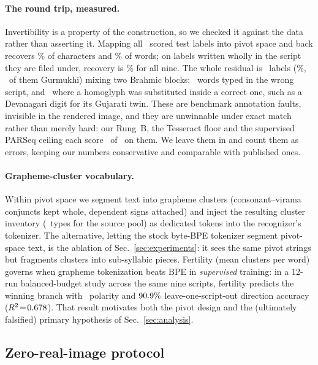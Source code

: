 \paragraph{The round trip, measured.} Invertibility is a property of the construction, so we
checked it against the data rather than asserting it. Mapping all \rtTestN\ scored test labels into
pivot space and back recovers \rtCharPooled\% of characters and \rtWordPooled\% of words; on labels
written wholly in the script they are filed under, recovery is \rtWordPure\% for all nine. The
whole residual is \rtCrossN\ labels (\rtCrossPct\%, \rtCrossGurmukhi\ of them Gurmukhi) mixing two
Brahmic blocks: \rtCrossWhole\ words typed in the wrong script, and \rtCrossMixed\ where a homoglyph
was substituted inside a correct one, such as a Devanagari digit for its Gujarati twin. These are
benchmark annotation faults, invisible in the rendered image, and they are unwinnable under exact
match rather than merely hard: our Rung~B, the Tesseract floor and the supervised PARSeq ceiling
each score \rtCrossSolved\ of \rtCrossN\ on them. We leave them in and count them as errors, keeping
our numbers conservative and comparable with published ones.

\paragraph{Grapheme-cluster vocabulary.} Within pivot space we segment text into grapheme
clusters (consonant--virama conjuncts kept whole, dependent signs attached) and inject the
resulting cluster inventory (\pivotTypes\ types for the source pool) as dedicated tokens into the
recognizer's tokenizer. The alternative, letting the stock byte-BPE tokenizer segment
pivot-space text, is the ablation of Sec.~\ref{sec:experiments}: it sees the same pivot
strings but fragments clusters into sub-syllabic pieces. Fertility (mean clusters per word)
governs when grapheme tokenization beats BPE in \emph{supervised} training: in a 12-run
balanced-budget study across the same nine scripts, fertility predicts the winning branch with
\lawPolarity\ polarity and $90.9\%$ leave-one-script-out direction accuracy
($R^2\!=\!0.678$). %
That result motivates both the pivot design and the (ultimately falsified) primary hypothesis of
Sec.~\ref{sec:analysis}.

\subsection{Zero-real-image protocol}
\label{sec:protocol}

